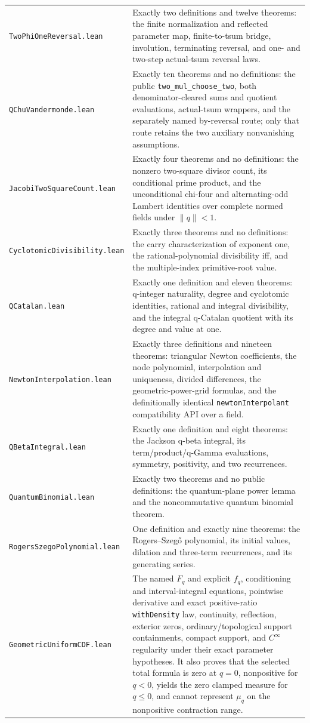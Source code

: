 \documentclass[11pt,oneside]{article}
\theoremstyle{definition}
\theoremstyle{remark}
\begin{document}
\begin{longtable}{>{\raggedright\arraybackslash}p{} >{\raggedright\arraybackslash}p{}}
\nolinkurl{TwoPhiOneReversal.lean} & Exactly two definitions and twelve theorems: the finite normalization and reflected parameter map, finite-to-tsum bridge, involution, terminating reversal, and one- and two-step actual-tsum reversal laws. \\
\nolinkurl{QChuVandermonde.lean} & Exactly ten theorems and no definitions: the public \nolinkurl{two_mul_choose_two}, both denominator-cleared sums and quotient evaluations, actual-tsum wrappers, and the separately named by-reversal route; only that route retains the two auxiliary nonvanishing assumptions. \\
\nolinkurl{JacobiTwoSquareCount.lean} & Exactly four theorems and no definitions: the nonzero two-square divisor count, its conditional prime product, and the unconditional chi-four and alternating-odd Lambert identities over complete normed fields under \(\lVert q\rVert<1\). \\
\nolinkurl{CyclotomicDivisibility.lean} & Exactly three theorems and no definitions: the carry characterization of exponent one, the rational-polynomial divisibility iff, and the multiple-index primitive-root value. \\
\nolinkurl{QCatalan.lean} & Exactly one definition and eleven theorems: q-integer naturality, degree and cyclotomic identities, rational and integral divisibility, and the integral q-Catalan quotient with its degree and value at one. \\
\nolinkurl{NewtonInterpolation.lean} & Exactly three definitions and nineteen theorems: triangular Newton coefficients, the node polynomial, interpolation and uniqueness, divided differences, the geometric-power-grid formulas, and the definitionally identical \nolinkurl{newtonInterpolant} compatibility API over a field. \\
\nolinkurl{QBetaIntegral.lean} & Exactly one definition and eight theorems: the Jackson q-beta integral, its term/product/q-Gamma evaluations, symmetry, positivity, and two recurrences. \\
\nolinkurl{QuantumBinomial.lean} & Exactly two theorems and no public definitions: the quantum-plane power lemma and the noncommutative quantum binomial theorem. \\
\nolinkurl{RogersSzegoPolynomial.lean} & One definition and exactly nine theorems: the Rogers--Szeg\H{o} polynomial, its initial values, dilation and three-term recurrences, and its generating series. \\
\nolinkurl{GeometricUniformCDF.lean} & The named \(F_q\) and explicit \(f_q\), conditioning and interval-integral equations, pointwise derivative and exact positive-ratio \nolinkurl{withDensity} law, continuity, reflection, exterior zeros, ordinary/topological support containments, compact support, and \(C^\infty\) regularity under their exact parameter hypotheses.  It also proves that the selected total formula is zero at \(q=0\), nonpositive for \(q<0\), yields the zero clamped measure for \(q\le0\), and cannot represent \(\mu_q\) on the nonpositive contraction range. \\

\end{longtable}
\end{document}
